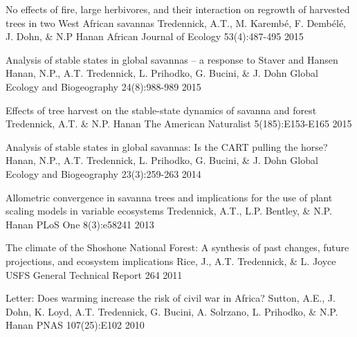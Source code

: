 \begin{pubentries}
  \pubentry
    {No effects of fire, large herbivores, and their interaction on regrowth of harvested trees in two West African savannas} %
    {Tredennick, A.T., M. Karemb\'{e}, F. Demb\'{e}l\'{e}, J. Dohn, \& N.P Hanan} %
    {African Journal of Ecology} %
    {53(4):487-495} %
    {2015} %

  \pubentry
    {Analysis of stable states in global savannas – a response to Staver and Hansen} %
    {Hanan, N.P., A.T. Tredennick, L. Prihodko, G. Bucini, \& J. Dohn} %
    {Global Ecology and Biogeography} %
    {24(8):988-989} %
    {2015} %

  \pubentry
    {Effects of tree harvest on the stable-state dynamics of savanna and forest} %
    {Tredennick, A.T. \& N.P. Hanan} %
    {The American Naturalist} %
    {5(185):E153-E165} %
    {2015} %

  \pubentry
    {Analysis of stable states in global savannas: Is the CART pulling the horse?} %
    {Hanan, N.P., A.T. Tredennick, L. Prihodko, G. Bucini, \& J. Dohn} %
    {Global Ecology and Biogeography} %
    {23(3):259-263} %
    {2014} %

  \pubentry
    {Allometric convergence in savanna trees and implications for the use of plant scaling models in variable ecosystems} %
    {Tredennick, A.T., L.P. Bentley, \& N.P. Hanan} %
    {PLoS One} %
    {8(3):e58241} %
    {2013} %

  \pubentry
    {The climate of the Shoshone National Forest: A synthesis of past changes, future projections, and ecosystem implications} %
    {Rice, J., A.T. Tredennick, \& L. Joyce} %
    {USFS General Technical Report} %
    {264} %
    {2011} %

  \pubentry
    {Letter: Does warming increase the risk of civil war in Africa?} %
    {Sutton, A.E., J. Dohn, K. Loyd, A.T. Tredennick, G. Bucini, A. Solrzano, L. Prihodko, \& N.P. Hanan} %
    {PNAS} %
    {107(25):E102} %
    {2010} %


\end{pubentries}
